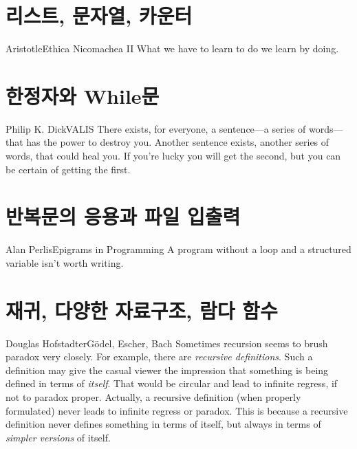 \documentclass[a4paper,10pt]{memoir}
\begin{document}
\chapter{리스트, 문자열, 카운터}
\begin{epi}{Aristotle}{Ethica Nicomachea II}
  What we have to learn to do we learn by doing.
\end{epi}


\chapter{한정자와 While문}
\begin{epi}{Philip K. Dick}{VALIS}
  There exists, for everyone, a sentence---a series of words---that has the power to destroy you.
  Another sentence exists, another series of words, that could heal you.
  If you're lucky you will get the second, but you can be certain of getting the first.
\end{epi}


\chapter{반복문의 응용과 파일 입출력}
\begin{epi}{Alan Perlis}{Epigrams in Programming}
  A program without a loop and a structured variable isn't worth writing.
\end{epi}


% 

\chapter{재귀, 다양한 자료구조, 람다 함수}
\begin{epi}{Douglas Hofstadter}{Gödel, Escher, Bach}
  Sometimes recursion seems to brush paradox very closely.
  For example, there are \emph{recursive definitions}.
  Such a definition may give the casual viewer the impression that something is being defined in terms of \emph{itself}.
  That would be circular and lead to infinite regress, if not to paradox proper.
  Actually, a recursive definition (when properly formulated) never leads to infinite regress or paradox.
  This is because a recursive definition never defines something in terms of itself, but always in terms of \emph{simpler versions} of itself.
\end{epi}

\end{document}
